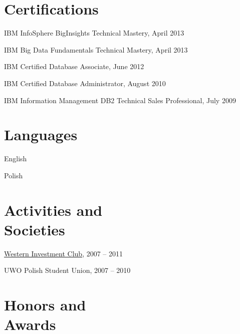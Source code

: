 \documentclass[margin,line]{resume}
\begin{document}
\begin{resume}
\section{\mysidestyle Certifications}

\begin{list2}
	\item IBM InfoSphere BigInsights Technical Mastery, April 2013
	\item IBM Big Data Fundamentals Technical Mastery, April 2013
	\item IBM Certified Database Associate, June 2012
	\item IBM Certified Database Administrator, August 2010
	\item IBM Information Management DB2 Technical Sales Professional, July 2009
\end{list2}

\section{\mysidestyle Languages}

\begin{list2}
	\item English
	\item Polish
\end{list2}

\section{\mysidestyle Activities and\\Societies}

\begin{list2}
	\item \href{http://www.westerninvestmentclub.ca/}{Western Investment Club}, 2007 -- 2011
	\item UWO Polish Student Union, 2007 -- 2010
\end{list2}

\section{\mysidestyle Honors and\\Awards}


\end{resume}
\end{document}
